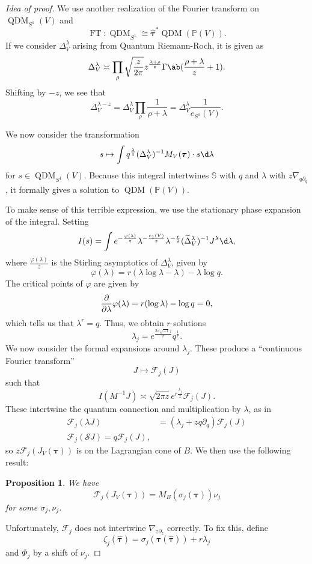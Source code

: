 \documentclass[leqno, openany]{memoir}
\newtheorem{prop}[thm]{Proposition}
\theoremstyle{definition}
\theoremstyle{remark}
\theoremstyle{plain}
\theoremstyle{definition}
\theoremstyle{remark}
\renewcommand{\P}{\mathbb{P}}
\newcommand{\mc}[1]{\mathcal{#1}}
\newcommand{\on}[1]{\operatorname{#1}}
\newcommand{\wt}[1]{\widetilde{#1}}
\newcommand{\wh}[1]{\widehat{#1}}
\DeclareMathOperator{\QDM}{QDM}
\begin{document}
\begin{proof}[Idea of proof]
    We use another realization of the Fourier transform on $\QDM_{S^1}(V)$ and
    \[ \on{FT} \colon \QDM_{S^1} \cong \wh{\bm{\tau}}^* \QDM(\P(V)). \]
    If we consider $\Delta_V^{\lambda}$ arising from Quantum Riemann-Roch, it is given as
    \[ \Delta_V^{\lambda} \asymp \prod_{\rho} \sqrt{\frac{z}{2\pi}} z^{\frac{\lambda + \rho}{z}} \Gamma\ab( \frac{\rho + \lambda}{z} + 1). \]
    Shifting by $-z$, we see that
    \[ \Delta_V^{\lambda - z} = \Delta_V^{\lambda} \prod_{\rho} \frac{1}{\rho + \lambda} = \Delta_V^{\lambda} \frac{1}{e_{S^1}(V)}. \]

    We now consider the transformation
    \[ s \mapsto \int  q^{\frac{\lambda}{z}} (\Delta_V^{\lambda})^{-1} M_V(\bm{\tau}) \cdot s \d \lambda \]
    for $s \in \QDM_{S^1}(V)$.
    Because this integral intertwines $\mathbb{S}$ with $q$ and $\lambda$ with $z \nabla_{q \partial_q}$, it formally gives a solution to $\QDM(\P(V))$.

    To make sense of this terrible expression, we use the stationary phase expansion of the integral. Setting
    \[ I(s) = \int e^{-\frac{\varphi(\lambda)}{z}} \lambda^{-\frac{c_1(V)}{z}} \lambda^{-\frac{r}{2}} (\wt{\Delta}_V^{\lambda})^{-1} J^{\lambda} \d \lambda, \]
    where $\frac{\varphi(\lambda)}{z}$ is the Stirling asymptotics of $\Delta_V^{\lambda}$, given by
    \[ \varphi(\lambda) = r (\lambda \log \lambda - \lambda) - \lambda \log q. \]
    The critical points of $\varphi$ are given by
    \[ \pdv{}{\lambda} \varphi(\lambda) = r (\log \lambda) - \log q = 0, \]
    which tells us that $\lambda^r = q$. Thus, we obtain $r$ solutions
    \[ \lambda_j=  e^{\frac{2\pi \sqrt{-1} j}{r}} q^{\frac{1}{r}}. \]
    We now consider the formal expansions around $\lambda_j$. These produce a ``continuous Fourier transform''
    \[ J \mapsto \mc{F}_j(J) \]
    such that
    \[ I(M^{-1} J) \asymp \sqrt{2 \pi z} e^{r \frac{\lambda_j}{z}} \mc{F}_j(J). \]
    These intertwine the quantum connection and multiplication by $\lambda$, as in
    \begin{align*}
        \mc{F}_j(\lambda J) &= (\lambda_j + z q \partial_q) \mc{F}_j(J) \\
        \mc{F}_j(\mc{S} J) = q \mc{F}_j(J),
    \end{align*}
    so $z \mc{F}_j(J_V(\bm{\tau}))$ is on the Lagrangian cone of $B$. We then use the following result:
    \begin{prop}
        We have
        \[ \mc{F}_j(J_V(\bm{\tau})) = M_B(\sigma_j(\bm{{\tau}})) \nu_j \]
        for some $\sigma_j, \nu_j$.
    \end{prop}
    Unfortunately, $\mc{F}_j$ does not intertwine $\nabla_{z \partial_z}$ correctly. To fix this, define
    \[ \zeta_j (\wh{\bm{\tau}}) = \sigma_j(\bm{\tau}(\wh{\bm{\tau}})) + r \lambda_j \]
    and $\Phi_j$ by a shift of $\nu_j$.
\end{proof}
\end{document}
